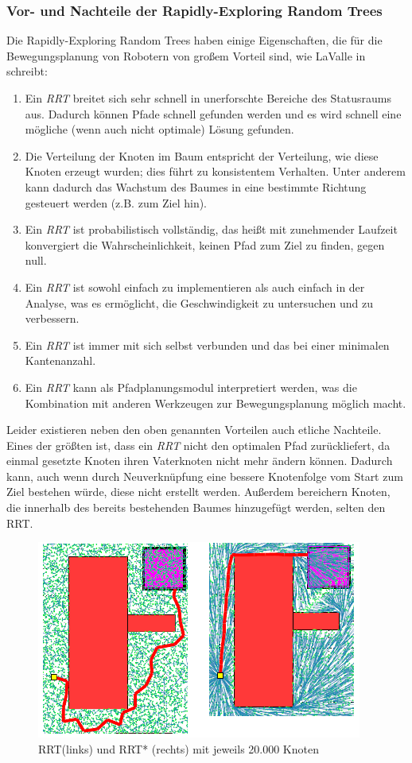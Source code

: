 \subsubsection{Vor- und Nachteile der Rapidly-Exploring Random Trees}
Die Rapidly-Exploring Random Trees haben einige Eigenschaften, die für die Bewegungsplanung von Robotern von großem Vorteil sind, wie LaValle in  \citep[Kapitel 3 in][]{Lav98} schreibt:
\begin{enumerate}
\item Ein \textit{RRT} breitet sich sehr schnell in unerforschte Bereiche des Statusraums aus. Dadurch können Pfade schnell gefunden werden und es wird schnell eine mögliche (wenn auch nicht optimale) Lösung gefunden.
\item Die Verteilung der Knoten im Baum entspricht der Verteilung, wie diese Knoten erzeugt wurden; dies führt zu konsistentem Verhalten. Unter anderem kann dadurch das Wachstum des Baumes in eine bestimmte Richtung gesteuert werden (z.B. zum Ziel hin).
\item Ein \textit{RRT} ist probabilistisch vollständig, das heißt mit zunehmender Laufzeit konvergiert die Wahrscheinlichkeit, keinen Pfad zum Ziel zu finden, gegen null.
\item Ein \textit{RRT} ist sowohl einfach zu implementieren als auch einfach in der Analyse, was es ermöglicht, die Geschwindigkeit zu untersuchen und zu verbessern.
\item Ein \textit{RRT} ist immer mit sich selbst verbunden und das bei einer minimalen Kantenanzahl.
\item Ein \textit{RRT} kann als Pfadplanungsmodul interpretiert werden, was die Kombination mit anderen Werkzeugen zur Bewegungsplanung möglich macht.
\end{enumerate}
Leider existieren neben den oben genannten Vorteilen auch etliche Nachteile. Eines der größten ist, dass ein \textit{RRT} nicht den optimalen Pfad zurückliefert, da einmal gesetzte Knoten ihren Vaterknoten nicht mehr ändern können. Dadurch kann, auch wenn durch Neuverknüpfung eine bessere Knotenfolge vom Start zum Ziel bestehen würde, diese nicht erstellt werden. Außerdem bereichern Knoten, die innerhalb des bereits bestehenden Baumes hinzugefügt werden, selten den RRT.\\

\begin{figure}[htb]
    \centering
 \includegraphics[scale=1]{Bilder/RRT_RRT_star.png} 
 \caption{RRT(links) und RRT* (rechts) mit jeweils 20.000 Knoten}
      
\end{figure}

